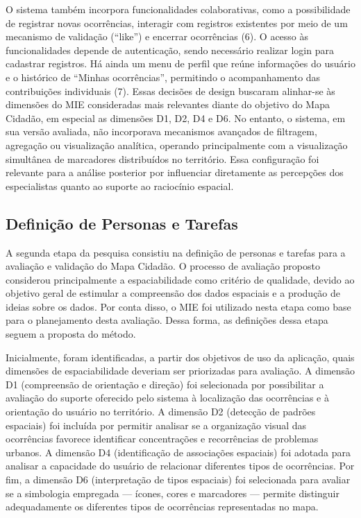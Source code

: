 \documentclass[12pt]{article}
\begin{document}
O sistema também incorpora funcionalidades colaborativas, como a possibilidade de registrar novas ocorrências, interagir com registros existentes por meio de um mecanismo de validação (“like”) e encerrar ocorrências (6). O acesso às funcionalidades depende de autenticação, sendo necessário realizar login para cadastrar registros. Há ainda um menu de perfil que reúne informações do usuário e o histórico de “Minhas ocorrências”, permitindo o acompanhamento das contribuições individuais (7). Essas decisões de design buscaram alinhar-se às dimensões do MIE consideradas mais relevantes diante do objetivo do Mapa Cidadão, em especial as dimensões D1, D2, D4 e D6. No entanto, o sistema, em sua versão avaliada, não incorporava mecanismos avançados de filtragem, agregação ou visualização analítica, operando principalmente com a visualização simultânea de marcadores distribuídos no território. Essa configuração foi relevante para a análise posterior por influenciar diretamente as percepções dos especialistas quanto ao suporte ao raciocínio espacial.





\subsection{Definição de Personas e Tarefas}


A segunda etapa da pesquisa consistiu na definição de personas e tarefas para a avaliação e validação do Mapa Cidadão. O processo de avaliação proposto considerou principalmente a espaciabilidade como critério de qualidade, devido ao objetivo geral de estimular a compreensão dos dados espaciais e a produção de ideias sobre os dados. Por conta disso, o MIE \cite{neto:ihc} foi utilizado nesta etapa como base para o planejamento desta avaliação. Dessa forma, as definições dessa etapa seguem a proposta do método.

Inicialmente, foram identificadas, a partir dos objetivos de uso da aplicação, quais dimensões de espaciabilidade deveriam ser priorizadas para avaliação. A dimensão D1 (compreensão de orientação e direção) foi selecionada por possibilitar a avaliação do suporte oferecido pelo sistema à localização das ocorrências e à orientação do usuário no território. A dimensão D2 (detecção de padrões espaciais) foi incluída por permitir analisar se a organização visual das ocorrências favorece identificar concentrações e recorrências de problemas urbanos. A dimensão D4 (identificação de associações espaciais) foi adotada para analisar a capacidade do usuário de relacionar diferentes tipos de ocorrências. Por fim, a dimensão D6 (interpretação de tipos espaciais) foi selecionada para avaliar se a simbologia empregada — ícones, cores e marcadores — permite distinguir adequadamente os diferentes tipos de ocorrências representadas no mapa.
\end{document}
